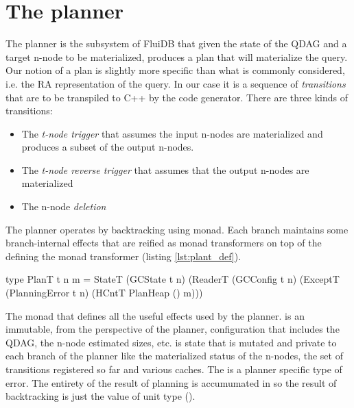 \section{The planner}
\label{sec:planner}

The planner is the subsystem of FluiDB that given the state of the
QDAG and a target n-node to be materialized, produces a plan
that will materialize the query.  Our notion of a plan is
slightly more specific than what is commonly considered, i.e. the RA representation of the query.
In our case it is a sequence of \emph{transitions} that are to be transpiled to C++ by the
code generator. There are three kinds of transitions:

\begin{itemize}
\item The \emph{t-node trigger} that assumes the input n-nodes are materialized and
produces a subset of the output n-nodes.
\item The \emph{t-node reverse trigger} that assumes that the output n-nodes are materialized
\item The n-node \emph{deletion}
\end{itemize}

The planner operates by backtracking using  monad. Each branch
maintains some branch-internal effects that are reified as monad
transformers on top of the  defining the  monad
transformer (listing \ref{lst:plant_def}).

\begin{code}
\begin{haskellcode}
type PlanT t n m =
  StateT
    (GCState t n)
    (ReaderT (GCConfig t n)
     (ExceptT (PlanningError t n)
      (HCntT PlanHeap () m)))
\end{haskellcode}
  \caption{\label{lst:plant_def}The monad that defines all the useful
    effects used by the planner.  is an immutable,
    from the perspective of the planner, configuration that includes
    the QDAG, the n-node estimated sizes, etc.  is state that is
    mutated and private to each branch of the planner like the
    materialized status of the n-nodes, the set of transitions
    registered so far and various caches. The 
    is a planner specific type of error. The entirety of the result of
    planning is accumumated in  so the result of
    backtracking is just the value of unit type (\hask{()}).}
\end{code}

